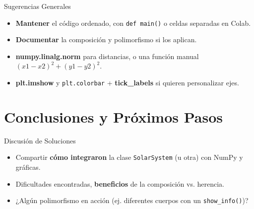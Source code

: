 \documentclass[10pt]{beamer}
\begin{document}
\begin{frame}{Sugerencias Generales}
  \begin{itemize}
    \item \textbf{Mantener} el código ordenado, con \texttt{def main()} o celdas separadas en Colab.
    \item \textbf{Documentar} la composición y polimorfismo si los aplican.
    \item \textbf{numpy.linalg.norm} para distancias, o una función manual \((x1-x2)^2 + (y1-y2)^2\).
    \item \textbf{plt.imshow} y \texttt{plt.colorbar} + \textbf{tick\_labels} si quieren personalizar ejes.
  \end{itemize}
\end{frame}

\section{Conclusiones y Próximos Pasos}

\begin{frame}{Discusión de Soluciones}
  \begin{itemize}
    \item Compartir \textbf{cómo integraron} la clase \texttt{SolarSystem} (u otra) con NumPy y gráficas.
    \item Dificultades encontradas, \textbf{beneficios} de la composición vs. herencia.
    \item ¿Algún polimorfismo en acción (ej. diferentes cuerpos con un \texttt{show\_info()})?
  \end{itemize}
\end{frame}
\end{document}
